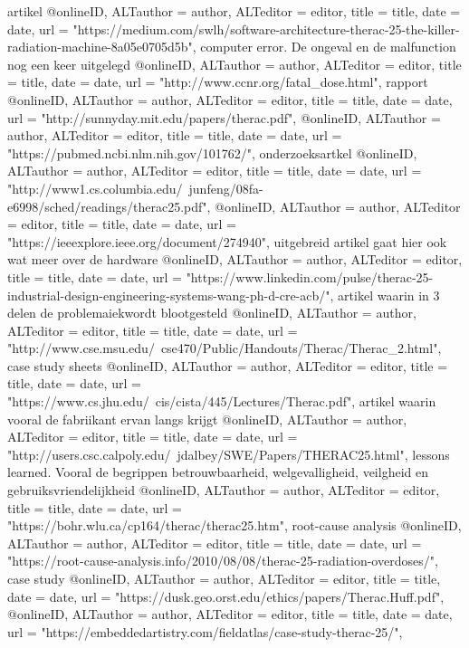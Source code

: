 {{{artikel
@online{ID,	ALTauthor = {author},	ALTeditor = {editor},	title = {title},	date = {date},	url = {"https://medium.com/swlh/software-architecture-therac-25-the-killer-radiation-machine-8a05e0705d5b"},}
computer error. De ongeval en de malfunction nog een keer uitgelegd
@online{ID,	ALTauthor = {author},	ALTeditor = {editor},	title = {title},	date = {date},	url = {"http://www.ccnr.org/fatal_dose.html"},}
rapport
@online{ID,	ALTauthor = {author},	ALTeditor = {editor},	title = {title},	date = {date},	url = {"http://sunnyday.mit.edu/papers/therac.pdf"},}
@online{ID,	ALTauthor = {author},	ALTeditor = {editor},	title = {title},	date = {date},	url = {"https://pubmed.ncbi.nlm.nih.gov/101762/"},}
onderzoeksartkel
@online{ID,	ALTauthor = {author},	ALTeditor = {editor},	title = {title},	date = {date},	url = {"http://www1.cs.columbia.edu/~junfeng/08fa-e6998/sched/readings/therac25.pdf"},}
@online{ID,	ALTauthor = {author},	ALTeditor = {editor},	title = {title},	date = {date},	url = {"https://ieeexplore.ieee.org/document/274940"},}
uitgebreid artikel gaat hier ook wat meer over de hardware
@online{ID,	ALTauthor = {author},	ALTeditor = {editor},	title = {title},	date = {date},	url = {"https://www.linkedin.com/pulse/therac-25-industrial-design-engineering-systems-wang-ph-d-cre-acb/"},}
artikel waarin in 3 delen de problemaiekwordt blootgesteld
@online{ID,	ALTauthor = {author},	ALTeditor = {editor},	title = {title},	date = {date},	url = {"http://www.cse.msu.edu/~cse470/Public/Handouts/Therac/Therac_2.html"},}
case study sheets
@online{ID,	ALTauthor = {author},	ALTeditor = {editor},	title = {title},	date = {date},	url = {"https://www.cs.jhu.edu/~cis/cista/445/Lectures/Therac.pdf"},}
artikel waarin vooral de fabriikant ervan langs krijgt
@online{ID,	ALTauthor = {author},	ALTeditor = {editor},	title = {title},	date = {date},	url = {"http://users.csc.calpoly.edu/~jdalbey/SWE/Papers/THERAC25.html"},}
lessons learned. Vooral de begrippen betrouwbaarheid, welgevalligheid, veilgheid en gebruiksvriendelijkheid
@online{ID,	ALTauthor = {author},	ALTeditor = {editor},	title = {title},	date = {date},	url = {"https://bohr.wlu.ca/cp164/therac/therac25.htm"},}
root-cause analysis
@online{ID,	ALTauthor = {author},	ALTeditor = {editor},	title = {title},	date = {date},	url = {"https://root-cause-analysis.info/2010/08/08/therac-25-radiation-overdoses/"},}
case study
@online{ID,	ALTauthor = {author},	ALTeditor = {editor},	title = {title},	date = {date},	url = {"https://dusk.geo.orst.edu/ethics/papers/Therac.Huff.pdf"},}
@online{ID,	ALTauthor = {author},	ALTeditor = {editor},	title = {title},	date = {date},	url = {"https://embeddedartistry.com/fieldatlas/case-study-therac-25/"},}
}}}
